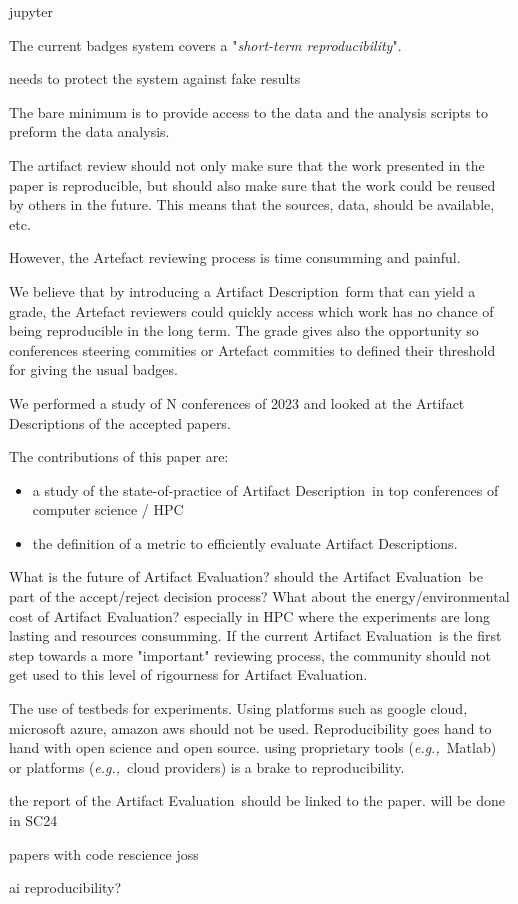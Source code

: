 \documentclass[sigconf]{acmart}
\newcommand{\eg}{\emph{e.g.,}}
\newcommand{\ad}{Artifact Description}
\newcommand{\aeval}{Artifact Evaluation}
\begin{document}
jupyter 

The current badges system covers a "\emph{short-term reproducibility}".

needs to protect the system against fake results 

The bare minimum is to provide access to the data and the analysis scripts to preform the data analysis.

The artifact review should not only make sure that the work presented in the paper is reproducible, but should also make sure that the work could be reused by others in the future.
This means that the sources, data, should be available, etc.

However, the Artefact reviewing process is time consumming and painful.

We believe that by introducing a \ad\ form that can yield a grade, the Artefact reviewers could quickly access which work has no chance of being reproducible in the long term.
The grade gives also the opportunity so conferences steering commities or Artefact commities to defined their threshold for giving the usual badges.


We performed a study of N conferences of 2023 and looked at the \ad s of the accepted papers.

The contributions of this paper are:
\begin{itemize}
  \item a study of the state-of-practice of \ad\ in top conferences of computer science / HPC
  \item the definition of a metric to efficiently evaluate \ad s.
\end{itemize}


What is the future of \aeval?
should the \aeval\ be part of the accept/reject decision process?
What about the energy/environmental cost of \aeval?
especially in HPC where the experiments are long lasting and resources consumming.
If the current \aeval\ is the first step towards a more "important" reviewing process, the community should not get used to this level of rigourness for \aeval.


The use of testbeds for experiments.
Using platforms such as google cloud, microsoft azure, amazon aws should not be used.
Reproducibility goes hand to hand with open science and open source.
using proprietary tools (\eg\ Matlab) or platforms (\eg\ cloud providers) is a brake to reproducibility.


the report of the \aeval\ should be linked to the paper.
will be done in SC24

papers with code
rescience
joss

ai reproducibility?






\end{document}
